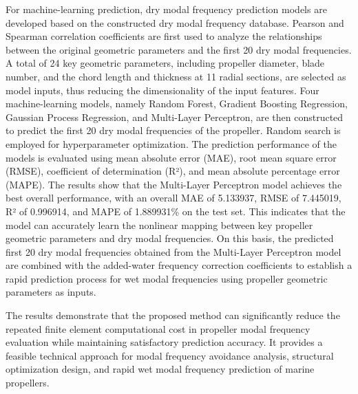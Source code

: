 For machine-learning prediction, dry modal frequency prediction models are developed based on the constructed dry modal frequency database. Pearson and Spearman correlation coefficients are first used to analyze the relationships between the original geometric parameters and the first 20 dry modal frequencies. A total of 24 key geometric parameters, including propeller diameter, blade number, and the chord length and thickness at 11 radial sections, are selected as model inputs, thus reducing the dimensionality of the input features. Four machine-learning models, namely Random Forest, Gradient Boosting Regression, Gaussian Process Regression, and Multi-Layer Perceptron, are then constructed to predict the first 20 dry modal frequencies of the propeller. Random search is employed for hyperparameter optimization. The prediction performance of the models is evaluated using mean absolute error (MAE), root mean square error (RMSE), coefficient of determination (R²), and mean absolute percentage error (MAPE). The results show that the Multi-Layer Perceptron model achieves the best overall performance, with an overall MAE of 5.133937, RMSE of 7.445019, R² of 0.996914, and MAPE of 1.889931\% on the test set. This indicates that the model can accurately learn the nonlinear mapping between key propeller geometric parameters and dry modal frequencies. On this basis, the predicted first 20 dry modal frequencies obtained from the Multi-Layer Perceptron model are combined with the added-water frequency correction coefficients to establish a rapid prediction process for wet modal frequencies using propeller geometric parameters as inputs.

The results demonstrate that the proposed method can significantly reduce the repeated finite element computational cost in propeller modal frequency evaluation while maintaining satisfactory prediction accuracy. It provides a feasible technical approach for modal frequency avoidance analysis, structural optimization design, and rapid wet modal frequency prediction of marine propellers.